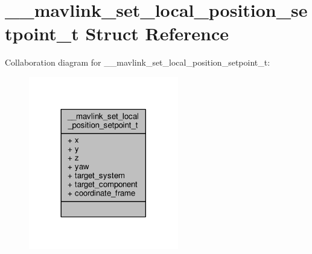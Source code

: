 \hypertarget{struct____mavlink__set__local__position__setpoint__t}{\section{\+\_\+\+\_\+mavlink\+\_\+set\+\_\+local\+\_\+position\+\_\+setpoint\+\_\+t Struct Reference}
\label{struct____mavlink__set__local__position__setpoint__t}
}


Collaboration diagram for \+\_\+\+\_\+mavlink\+\_\+set\+\_\+local\+\_\+position\+\_\+setpoint\+\_\+t\+:
\nopagebreak
\begin{figure}[H]
\begin{center}
\leavevmode
\includegraphics[width=185pt]{struct____mavlink__set__local__position__setpoint__t__coll__graph}
\end{center}
\end{figure}
